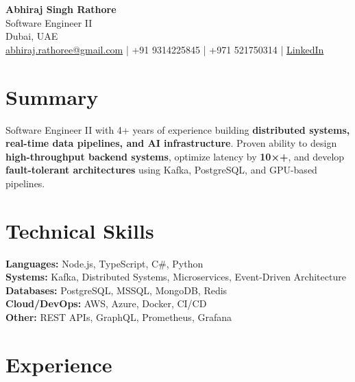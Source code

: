 \documentclass[a4paper,10pt]{article}
\begin{document}
\begin{center}
    {\LARGE \textbf{Abhiraj Singh Rathore}} \\
    Software Engineer II \\
    Dubai, UAE \\
    \href{mailto:abhiraj.rathoree@gmail.com}{abhiraj.rathoree@gmail.com} \;|\;
    +91 9314225845 \;|\;
    +971 521750314 \;|\;
    \href{https://linkedin.com/in/abhirajrathoree}{LinkedIn}
\end{center}

\section*{Summary}
Software Engineer II with 4+ years of experience building \textbf{distributed systems, real-time data pipelines, and AI infrastructure}. Proven ability to design \textbf{high-throughput backend systems}, optimize latency by \textbf{10×+}, and develop \textbf{fault-tolerant architectures} using Kafka, PostgreSQL, and GPU-based pipelines.

\section*{Technical Skills}
\textbf{Languages:} Node.js, TypeScript, C\#, Python \\
\textbf{Systems:} Kafka, Distributed Systems, Microservices, Event-Driven Architecture \\
\textbf{Databases:} PostgreSQL, MSSQL, MongoDB, Redis \\
\textbf{Cloud/DevOps:} AWS, Azure, Docker, CI/CD \\
\textbf{Other:} REST APIs, GraphQL, Prometheus, Grafana

\section*{Experience}
\end{document}

